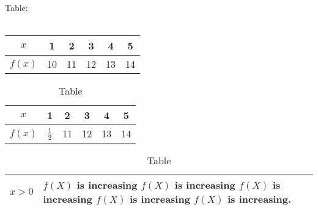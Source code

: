 \documentclass[12pt]{article}
\begin{document}
Table:\\ \\[6pt]
\begin{tabular}{|c||c|c|c|c|c|}
\hline
$x$ & 1 & 2 & 3 & 4 & 5\\ \hline
$f(x)$ & 10 & 11 & 12 & 13 &14\\ \hline
\end{tabular}

\vspace{1cm}

\begin{table}[H]
\centering
\def\arraystretch{1.5}
\begin{tabular}{|c||c|c|c|c|c|}
\hline
$x$ & 1 & 2 & 3 & 4 & 5\\ \hline
$f(x)$ & $\frac{1}{2}$ & 11 & 12 & 13 &14\\ \hline
\end{tabular}
\caption{Table}
\end{table}

\vspace{1cm}

\begin{table}[H]
\centering
\def\arraystretch{1.5}
\begin{tabular}{|l||p{}|}
\hline

$x>0$ & $f(X)$ is increasing 
$f(X)$ is increasing
$f(X)$ is increasing
$f(X)$ is increasing
$f(X)$ is increasing.
\\ \hline
\end{tabular}
\caption{Table}
\end{table}
\end{document}
